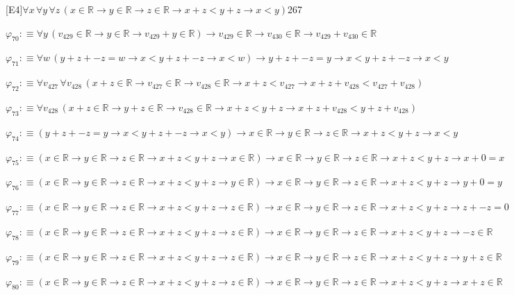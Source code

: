 \begin{fullproof}{[E4]}{$\forall x\,\forall y\,\forall z\,(x \in \mathbb{R} \to y \in \mathbb{R} \to z \in \mathbb{R} \to x + z < y + z \to x < y)$}{267}
\begin{abbrevlist}
\item $\varphi_{70} :\equiv \forall y\,(v_{429} \in \mathbb{R} \to y \in \mathbb{R} \to v_{429} + y \in \mathbb{R}) \to v_{429} \in \mathbb{R} \to v_{430} \in \mathbb{R} \to v_{429} + v_{430} \in \mathbb{R}$
\item $\varphi_{71} :\equiv \forall w\,(y + z + -z = w \to x < y + z + -z \to x < w) \to y + z + -z = y \to x < y + z + -z \to x < y$
\item $\varphi_{72} :\equiv \forall v_{427}\,\forall v_{428}\,(x + z \in \mathbb{R} \to v_{427} \in \mathbb{R} \to v_{428} \in \mathbb{R} \to x + z < v_{427} \to x + z + v_{428} < v_{427} + v_{428})$
\item $\varphi_{73} :\equiv \forall v_{428}\,(x + z \in \mathbb{R} \to y + z \in \mathbb{R} \to v_{428} \in \mathbb{R} \to x + z < y + z \to x + z + v_{428} < y + z + v_{428})$
\item $\varphi_{74} :\equiv (y + z + -z = y \to x < y + z + -z \to x < y) \to x \in \mathbb{R} \to y \in \mathbb{R} \to z \in \mathbb{R} \to x + z < y + z \to x < y$
\item $\varphi_{75} :\equiv (x \in \mathbb{R} \to y \in \mathbb{R} \to z \in \mathbb{R} \to x + z < y + z \to x \in \mathbb{R}) \to x \in \mathbb{R} \to y \in \mathbb{R} \to z \in \mathbb{R} \to x + z < y + z \to x + 0 = x$
\item $\varphi_{76} :\equiv (x \in \mathbb{R} \to y \in \mathbb{R} \to z \in \mathbb{R} \to x + z < y + z \to y \in \mathbb{R}) \to x \in \mathbb{R} \to y \in \mathbb{R} \to z \in \mathbb{R} \to x + z < y + z \to y + 0 = y$
\item $\varphi_{77} :\equiv (x \in \mathbb{R} \to y \in \mathbb{R} \to z \in \mathbb{R} \to x + z < y + z \to z \in \mathbb{R}) \to x \in \mathbb{R} \to y \in \mathbb{R} \to z \in \mathbb{R} \to x + z < y + z \to z + -z = 0$
\item $\varphi_{78} :\equiv (x \in \mathbb{R} \to y \in \mathbb{R} \to z \in \mathbb{R} \to x + z < y + z \to z \in \mathbb{R}) \to x \in \mathbb{R} \to y \in \mathbb{R} \to z \in \mathbb{R} \to x + z < y + z \to -z \in \mathbb{R}$
\item $\varphi_{79} :\equiv (x \in \mathbb{R} \to y \in \mathbb{R} \to z \in \mathbb{R} \to x + z < y + z \to z \in \mathbb{R}) \to x \in \mathbb{R} \to y \in \mathbb{R} \to z \in \mathbb{R} \to x + z < y + z \to y + z \in \mathbb{R}$
\item $\varphi_{80} :\equiv (x \in \mathbb{R} \to y \in \mathbb{R} \to z \in \mathbb{R} \to x + z < y + z \to z \in \mathbb{R}) \to x \in \mathbb{R} \to y \in \mathbb{R} \to z \in \mathbb{R} \to x + z < y + z \to x + z \in \mathbb{R}$

\end{abbrevlist}
\end{fullproof}
